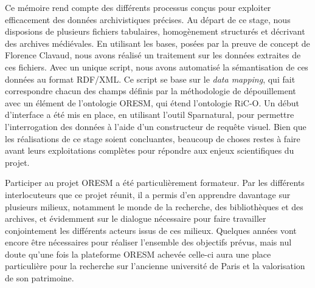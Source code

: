 Ce mémoire rend compte des différents processus conçus pour exploiter efficacement des données archivistiques précises. Au départ de ce stage, nous disposions de plusieurs fichiers tabulaires, homogènement structurés et décrivant des archives médiévales. En utilisant les bases, posées par la preuve de concept de Florence Clavaud, nous avons réalisé un traitement sur les données extraites de ces fichiers. Avec un unique script, nous avons automatisé la sémantisation de ces données au format RDF/XML. Ce script se base sur le \textit{data mapping}, qui fait correspondre chacun des champs définis par la méthodologie de dépouillement avec un élément de l'ontologie ORESM, qui étend l'ontologie RiC-O. Un début d'interface a été mis en place, en utilisant l'outil Sparnatural, pour permettre l'interrogation des données à l'aide d'un constructeur de requête visuel. Bien que les réalisations de ce stage soient concluantes, beaucoup de choses restes à faire avant leurs exploitations complètes pour répondre aux enjeux scientifiques du projet.
\par
Participer au projet ORESM a été particulièrement formateur. Par les différents interlocuteurs que ce projet réunit, il a permis d'en apprendre davantage sur plusieurs milieux, notamment le monde de la recherche, des bibliothèques et des archives, et évidemment sur le dialogue nécessaire pour faire travailler conjointement les différents acteurs issus de ces milieux. Quelques années vont encore être nécessaires pour réaliser l'ensemble des objectifs prévus, mais nul doute qu'une fois la plateforme ORESM achevée celle-ci aura une place particulière pour la recherche sur l'ancienne université de Paris et la valorisation de son patrimoine.